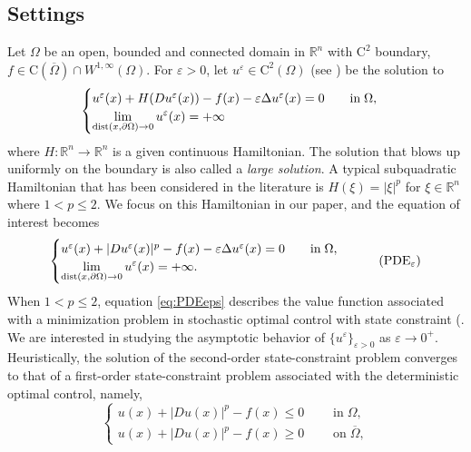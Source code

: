 \documentclass[12pt,reqno]{amsart}
\numberwithin{figure}{section}
\theoremstyle{plain}
\theoremstyle{remark}
\numberwithin{equation}{section}
\newcommand{\R}{\mathbb{R}}
\begin{document}
\subsection{Settings} Let $\Omega$ be an open, bounded and connected domain in $\mathbb{R}^n$ with $\mathrm{C}^2$ boundary, $f\in \mathrm{C}(\overline{\Omega})\cap W^{1,\infty}(\Omega)$. For $\varepsilon>0$, let $u^\varepsilon\in \mathrm{C}^2(\Omega)$ (see \cite{Lasry1989}) be the solution to
 \begin{equation}\label{eq:PDEepsa}
    \begin{cases}
      u^\varepsilon(x) + H(Du^\varepsilon(x)) - f(x) - \varepsilon \Delta u^\varepsilon(x) = 0 \qquad
    \text{in}\;\Omega, \vspace{0cm}\\
    \displaystyle  \lim_{\mathrm{dist}(x,\partial \Omega)\to 0} u^\varepsilon(x) = +\infty
    \end{cases} 
\end{equation}
 where $H:\R^n\to\R^n$ is a given continuous Hamiltonian. The solution that blows up uniformly on the boundary is also called a \emph{large solution}. A typical subquadratic Hamiltonian that has been considered in the literature is $H(\xi) = |\xi|^p$ for $\xi\in \R^n$ where $1<p\leq 2$. We focus on this Hamiltonian in our paper, and the equation of interest becomes
\begin{equation}\label{eq:PDEeps}
    \begin{cases}
      u^\varepsilon(x) + |Du^\varepsilon(x)|^p - f(x) - \varepsilon \Delta u^\varepsilon(x) = 0 \qquad
    \text{in}\;\Omega, \vspace{0cm}\\
    \displaystyle  \lim_{\mathrm{dist}(x,\partial \Omega)\to 0} u^\varepsilon(x) = +\infty.
    \end{cases} \tag{PDE$_\varepsilon$}
\end{equation}
When $1<p\leq 2$, equation \eqref{eq:PDEeps} describes the value function associated with a minimization problem in stochastic optimal control with state constraint (\cite{fabbri_stochastic_2017, Lasry1989}. We are interested in studying the asymptotic behavior of $\{u^\varepsilon\}_{\varepsilon>0}$ as $\varepsilon\rightarrow 0^+$. Heuristically, the solution of the second-order state-constraint problem converges to that of a first-order state-constraint problem associated with the deterministic optimal control, namely,
\begin{equation}\label{eq:PDE0}
    \begin{cases}
       u(x) + |Du(x)|^p - f(x) \leq 0\;\qquad\text{in}\;\Omega,\\
       u(x) + |Du(x)|^p - f(x) \geq 0\;\qquad\text{on}\;\overline{\Omega},
    \end{cases} \tag{PDE$_0$}
\end{equation}
\end{document}
